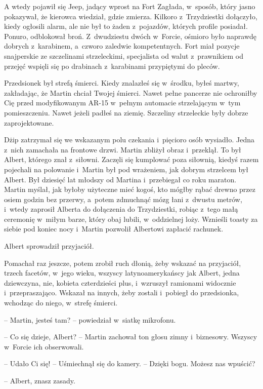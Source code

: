 \documentclass[oneside,polish,11pt,sfheadings]{mwbk}
\begin{document}
A wtedy pojawił się Jeep, jadący wprost na Fort Zagłada, w~sposób, który
jasno pokazywał, że kierowca wiedział, gdzie zmierza. Kilkoro z~Trzydziestki dołączyło, kiedy ogłosili alarm, ale nie był to żaden z~pojazdów, których profile posiadał. Ponuro, odblokował broń. Z~dwudziestu dwóch w~Forcie, ośmioro było naprawdę dobrych z~karabinem, a~czworo zaledwie kompetentnych. Fort miał pozycje snajperskie ze
szczelinami strzeleckimi, specjalista od walut z~prawnikiem od przejęć
wspięli się po drabinach z~karabinami przypiętymi do pleców.

Przedsionek był strefą śmierci. Kiedy znalazłeś się w~środku, byłeś
martwy, zakładając, że Martin chciał Twojej śmierci. Nawet pełne
pancerze nie ochroniłby Cię przed modyfikowanym AR-15 w~pełnym automacie
strzelającym w~tym pomieszczeniu. Nawet jeżeli padłeś na ziemię.
Szczeliny strzeleckie były dobrze zaprojektowane.

Dżip zatrzymał się we wskazanym polu czekania i~pięcioro osób wysiadło.
Jedna z~nich zamachała na frontowe drzwi. Martin zbliżył obraz i~przeklął. To był Albert, którego znał z~siłowni. Zaczęli się kumplować
poza siłownią, kiedyś razem pojechali na polowanie i~Martin był pod
wrażeniem, jak dobrym strzelcem był Albert. Był dziesięć lat młodszy od
Martina i~przebiegał co roku maraton. Martin myślał, jak byłoby
użyteczne mieć kogoś, kto mógłby rąbać drewno przez osiem godzin bez
przerwy, a~potem zdmuchnąć mózg łani z~dwustu metrów, i~wtedy zaprosił
Alberta do dołączenia do Trzydziestki, robiąc z~tego małą ceremonię w~miłym barze, który obaj lubili, w~oddzielnej loży. Wznieśli toasty za
siebie pod koniec nocy i~Martin pozwolił Albertowi zapłacić rachunek.

Albert sprowadził przyjaciół.

Pomachał raz jeszcze, potem zrobił ruch dłonią, żeby wskazać na
przyjaciół, trzech facetów, w~jego wieku, wszyscy latynoamerykańscy jak
Albert, jedna dziewczyna, nie, kobieta czterdzieści plus, i~wzruszył
ramionami widocznie i~przepraszająco. Wskazał na innych, żeby zostali i~pobiegł do przedsionka, wchodząc do niego, w~strefę śmierci.

-- Martin, jesteś tam? -- powiedział w~siatkę mikrofonu.

-- Co się dzieje, Albert? -- Martin zachował ton głosu zimny i~biznesowy.
Wszyscy w~Forcie ich obserwowali.

-- Udało Ci się! -- Uśmiechnął się do kamery. -- Dzięki bogu. Możesz nas
wpuścić?

-- Albert, znasz zasady.
\end{document}
